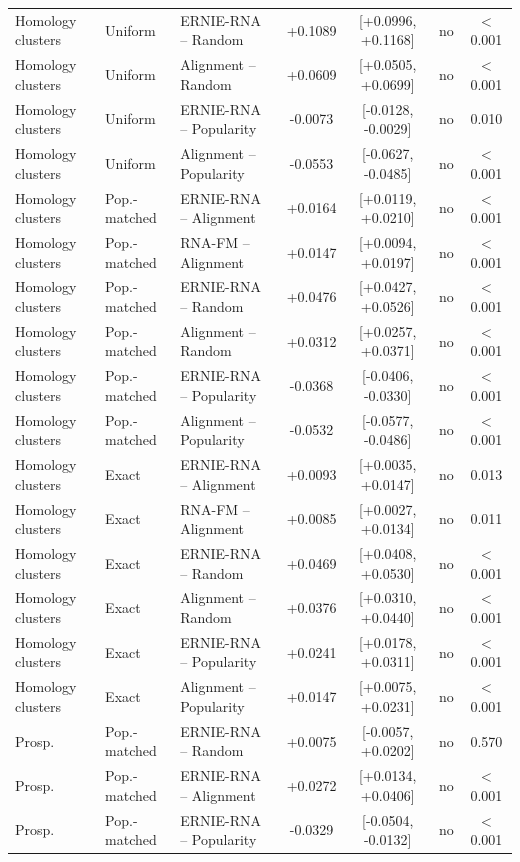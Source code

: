 {\begin{longtable}{lllcccc}
Homology clusters & Uniform & ERNIE-RNA -- Random & +0.1089 & [+0.0996, +0.1168] & no & $<$0.001\\
Homology clusters & Uniform & Alignment -- Random & +0.0609 & [+0.0505, +0.0699] & no & $<$0.001\\
Homology clusters & Uniform & ERNIE-RNA -- Popularity & -0.0073 & [-0.0128, -0.0029] & no & 0.010\\
Homology clusters & Uniform & Alignment -- Popularity & -0.0553 & [-0.0627, -0.0485] & no & $<$0.001\\
Homology clusters & Pop.-matched & ERNIE-RNA -- Alignment & +0.0164 & [+0.0119, +0.0210] & no & $<$0.001\\
Homology clusters & Pop.-matched & RNA-FM -- Alignment & +0.0147 & [+0.0094, +0.0197] & no & $<$0.001\\
Homology clusters & Pop.-matched & ERNIE-RNA -- Random & +0.0476 & [+0.0427, +0.0526] & no & $<$0.001\\
Homology clusters & Pop.-matched & Alignment -- Random & +0.0312 & [+0.0257, +0.0371] & no & $<$0.001\\
Homology clusters & Pop.-matched & ERNIE-RNA -- Popularity & -0.0368 & [-0.0406, -0.0330] & no & $<$0.001\\
Homology clusters & Pop.-matched & Alignment -- Popularity & -0.0532 & [-0.0577, -0.0486] & no & $<$0.001\\
Homology clusters & Exact & ERNIE-RNA -- Alignment & +0.0093 & [+0.0035, +0.0147] & no & 0.013\\
Homology clusters & Exact & RNA-FM -- Alignment & +0.0085 & [+0.0027, +0.0134] & no & 0.011\\
Homology clusters & Exact & ERNIE-RNA -- Random & +0.0469 & [+0.0408, +0.0530] & no & $<$0.001\\
Homology clusters & Exact & Alignment -- Random & +0.0376 & [+0.0310, +0.0440] & no & $<$0.001\\
Homology clusters & Exact & ERNIE-RNA -- Popularity & +0.0241 & [+0.0178, +0.0311] & no & $<$0.001\\
Homology clusters & Exact & Alignment -- Popularity & +0.0147 & [+0.0075, +0.0231] & no & $<$0.001\\
\midrule
Prosp. & Pop.-matched & ERNIE-RNA -- Random & +0.0075 & [-0.0057, +0.0202] & no & 0.570\\
Prosp. & Pop.-matched & ERNIE-RNA -- Alignment & +0.0272 & [+0.0134, +0.0406] & no & $<$0.001\\
Prosp. & Pop.-matched & ERNIE-RNA -- Popularity & -0.0329 & [-0.0504, -0.0132] & no & $<$0.001\\

\end{longtable}}
